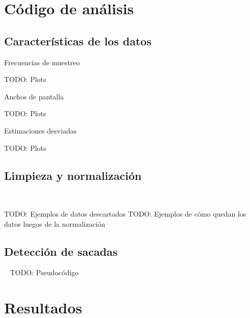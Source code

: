 \documentclass[aspectratio=169]{beamer}
\begin{document}
\section{Código de análisis}

\subsection{Características de los datos}

\begin{frame}{Frecuencias de muestreo}

TODO: Plots

\end{frame}

\begin{frame}{Anchos de pantalla}

TODO: Plots

\end{frame}

\begin{frame}{Estimaciones desviadas}

TODO: Plots

\end{frame}

\subsection{Limpieza y normalización}

\begin{frame}{~}

TODO: Ejemplos de datos descartados
TODO: Ejemplos de cómo quedan los datos luegos de la normalización

\end{frame}

\subsection{Detección de sacadas}

\begin{frame}{~}
TODO: Pseudocódigo
\end{frame}

\section{Resultados}
\end{document}
